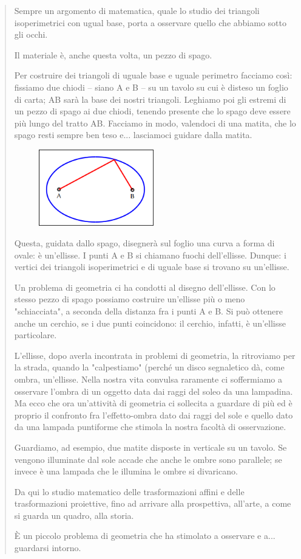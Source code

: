 \begin{quote}
Sempre un argomento di matematica, quale lo studio dei triangoli isoperimetrici con ugual base, porta a osservare quello che abbiamo sotto gli occhi. 

Il materiale è, anche questa volta, un pezzo di spago.

Per costruire dei triangoli di uguale base e uguale perimetro facciamo così: fissiamo due chiodi – siano A e B – su un tavolo su cui è disteso un foglio di carta; AB sarà la base dei nostri triangoli. Leghiamo poi gli estremi di un pezzo di spago ai due chiodi, tenendo presente che lo spago deve essere più lungo del tratto AB. Facciamo in modo, valendoci di una matita, che lo spago resti sempre ben teso e... lasciamoci guidare dalla matita.

\begin{figure}[H]
   \centering
   \includegraphics[width=5.0cm,trim=4 4 6 4,clip]{./images/cerchio/ellisse-emma.png}
   \label{ellisse-emma}
\end{figure}

Questa, guidata dallo spago, disegnerà sul foglio una curva a forma di ovale: è un'ellisse. I punti A e B si chiamano fuochi dell'ellisse. Dunque: i vertici dei triangoli isoperimetrici e di uguale base si trovano su un'ellisse.

Un problema di geometria ci ha condotti al disegno dell'ellisse. Con lo stesso pezzo di spago possiamo costruire un'ellisse più o meno "schiacciata", a seconda della distanza fra i punti A e B. Si può ottenere anche un cerchio, se i due punti coincidono: il cerchio, infatti, è un'ellisse particolare.    

L'ellisse, dopo averla incontrata in problemi di geometria, la ritroviamo per la strada, quando la "calpestiamo" (perché un disco segnaletico dà, come ombra, un'ellisse. Nella nostra vita convulsa raramente ci soffermiamo a osservare l'ombra di un oggetto data dai raggi del soleo da una lampadina. Ma ecco che ora un'attività di geometria ci sollecita a guardare di più ed è proprio il confronto fra l'effetto-ombra dato dai raggi del sole e quello dato da una lampada puntiforme che stimola la nostra facoltà di osservazione. 

Guardiamo, ad esempio, due matite disposte in verticale su un tavolo. Se vengono illuminate dal sole accade che anche le ombre sono parallele; se invece è una lampada che le illumina le ombre si divaricano.

Da qui lo studio matematico delle trasformazioni affini e delle trasformazioni proiettive, fino ad arrivare alla prospettiva, all'arte, a come si guarda un quadro, alla storia.

È un piccolo problema di geometria che ha stimolato a osservare e a... guardarsi intorno.

\end{quote}

